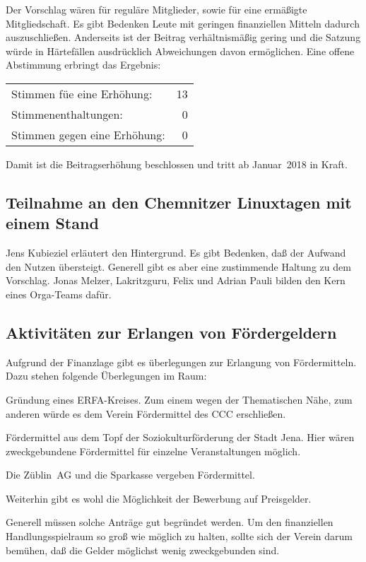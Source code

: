 \documentclass[]{scrartcl}
\newenvironment{packed_item}{
\begin{itemize}
\setlength{\itemsep}{-5pt}
\setlength{\parsep}{0pt}
}{\end{itemize}}
\newenvironment{eingerueckt}{
\begin{addmargin*}[3ex]{-3ex}
\begin{minipage}{\linewidth}
}{
\end{minipage}
\end{addmargin*}}
\newcommand{\qbi}{Jens Kubieziel}
\newcommand{\adrian}{Adrian Pauli}
\newcommand{\joe}{Jonas Melzer}
\begin{document}
\begin{multicols}{2}
Der Vorschlag wären  für reguläre Mitglieder, sowie  für
eine ermäßigte Mitgliedschaft. Es gibt Bedenken Leute mit geringen
finanziellen Mitteln dadurch auszuschließen. Anderseits ist der Beitrag
verhältnismäßig gering und die Satzung würde in Härtefällen ausdrücklich
Abweichungen davon ermöglichen. Eine offene Abstimmung erbringt das
Ergebnis:

\begin{eingerueckt}
\begin{tabular}{lr}
Stimmen füe eine Erhöhung: & 13 \\
Stimmenenthaltungen: & 0 \\
Stimmen gegen eine Erhöhung: & 0
\end{tabular}
\end{eingerueckt}

Damit ist die Beitragserhöhung beschlossen und tritt ab Januar~2018 in
Kraft.
    
\subsection{Teilnahme an den Chemnitzer Linuxtagen mit einem Stand}
\qbi{} erläutert den Hintergrund. Es gibt Bedenken, daß der Aufwand den Nutzen
übersteigt. Generell gibt es aber eine zustimmende Haltung zu dem Vorschlag.
\joe{}, Lakritzguru, Felix und \adrian{} bilden den Kern eines Orga-Teams dafür.

\subsection{Aktivitäten zur Erlangen von Fördergeldern}
Aufgrund der Finanzlage gibt es überlegungen zur Erlangung von
Fördermitteln. Dazu stehen folgende Überlegungen im Raum:
\begin{packed_item}
\item Gründung eines ERFA-Kreises. Zum einem wegen der Thematischen Nähe,
zum anderen würde es dem Verein Fördermittel des CCC erschließen. 
\item Fördermittel aus dem Topf der Soziokulturförderung der Stadt Jena.
Hier wären zweckgebundene Fördermittel für einzelne Veranstaltungen möglich.
\item Die Züblin~AG und die Sparkasse vergeben Fördermittel.
\item Weiterhin gibt es wohl die Möglichkeit der Bewerbung auf Preisgelder.
\end{packed_item}
Generell müssen solche Anträge gut begründet werden. Um den finanziellen
Handlungsspielraum so groß wie möglich zu halten, sollte sich der Verein
darum bemühen, daß die Gelder möglichst wenig zweckgebunden sind.


\end{multicols}
\end{document}
